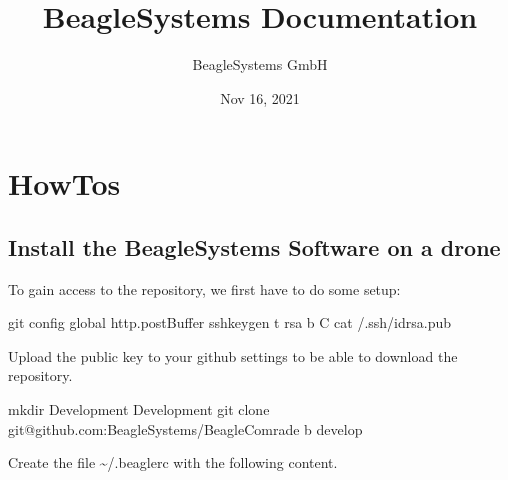\documentclass[letterpaper,10pt,english]{sphinxmanual}
\title{BeagleSystems Documentation}
\date{Nov 16, 2021}
\author{BeagleSystems GmbH}
\begin{document}
\pagestyle{empty}
\sphinxmaketitle
\pagestyle{plain}
\sphinxtableofcontents
\pagestyle{normal}
\label{\detokenize{index::doc}}



\chapter{HowTos}
\label{\detokenize{source/howtos:howtos}}\label{\detokenize{source/howtos::doc}}

\section{Install the BeagleSystems Software on a drone}
\label{\detokenize{source/howtos/install:install-the-beaglesystems-software-on-a-drone}}\label{\detokenize{source/howtos/install::doc}}
To gain access to the repository, we first have to do some setup:

\begin{sphinxVerbatim}[commandchars=\\\{\}]
\PYGZdl{} git config \PYGZhy{}\PYGZhy{}global http.postBuffer 
\PYGZdl{} ssh\PYGZhy{}keygen \PYGZhy{}t rsa \PYGZhy{}b  \PYGZhy{}C 
\PYGZdl{} cat \PYGZti{}/.ssh/id\PYGZus{}rsa.pub
\end{sphinxVerbatim}

Upload the public key to your github settings to be able to download the repository.

\begin{sphinxVerbatim}[commandchars=\\\{\}]
\PYGZdl{} mkdir Development
\PYGZdl{}  Development
\PYGZdl{} git clone git@github.com:BeagleSystems/BeagleComrade \PYGZhy{}b develop
\end{sphinxVerbatim}

Create the file \textasciitilde{}/.beaglerc with the following content.
\end{document}
